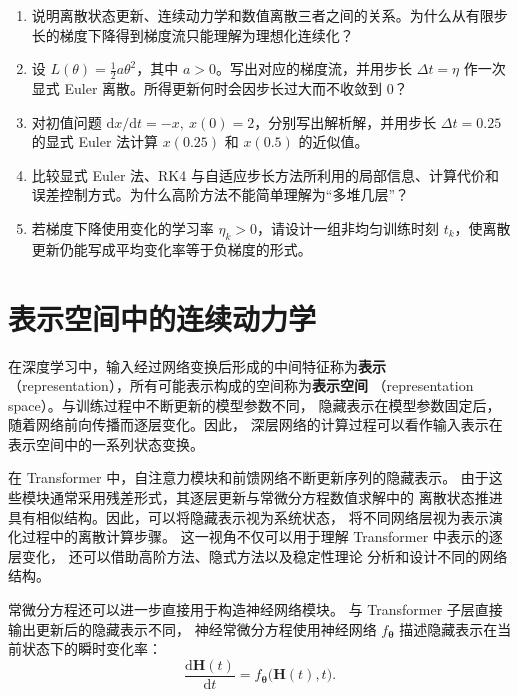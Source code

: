 \begin{exercisebox}
  \begin{enumerate}
    \item 说明离散状态更新、连续动力学和数值离散三者之间的关系。为什么从有限步长的梯度下降得到梯度流只能理解为理想化连续化？
    \item 设 \(L(\theta)=\tfrac12 a\theta^2\)，其中 \(a>0\)。写出对应的梯度流，并用步长 \(\Delta t=\eta\) 作一次显式 Euler 离散。所得更新何时会因步长过大而不收敛到 \(0\)？
    \item 对初值问题 \(\mathrm dx/\mathrm dt=-x,\ x(0)=2\)，分别写出解析解，并用步长 \(\Delta t=0.25\) 的显式 Euler 法计算 \(x(0.25)\) 和 \(x(0.5)\) 的近似值。
    \item 比较显式 Euler 法、RK4 与自适应步长方法所利用的局部信息、计算代价和误差控制方式。为什么高阶方法不能简单理解为“多堆几层”？
    \item 若梯度下降使用变化的学习率 \(\eta_k>0\)，请设计一组非均匀训练时刻 \(t_k\)，使离散更新仍能写成平均变化率等于负梯度的形式。
  \end{enumerate}
\end{exercisebox}



\section{表示空间中的连续动力学}
\label{sec:representation-dynamics}

在深度学习中，输入经过网络变换后形成的中间特征称为\textbf{表示}
（representation），所有可能表示构成的空间称为\textbf{表示空间}
（representation space）。与训练过程中不断更新的模型参数不同，
隐藏表示在模型参数固定后，随着网络前向传播而逐层变化。因此，
深层网络的计算过程可以看作输入表示在表示空间中的一系列状态变换。

在 Transformer 中，自注意力模块和前馈网络不断更新序列的隐藏表示。
由于这些模块通常采用残差形式，其逐层更新与常微分方程数值求解中的
离散状态推进具有相似结构。因此，可以将隐藏表示视为系统状态，
将不同网络层视为表示演化过程中的离散计算步骤。
这一视角不仅可以用于理解 Transformer 中表示的逐层变化，
还可以借助高阶方法、隐式方法以及稳定性理论
分析和设计不同的网络结构。

常微分方程还可以进一步直接用于构造神经网络模块。
与 Transformer 子层直接输出更新后的隐藏表示不同，
神经常微分方程使用神经网络
\(f_{\boldsymbol{\theta}}\)
描述隐藏表示在当前状态下的瞬时变化率：
\begin{equation}
    \frac{\mathrm{d}\boldsymbol{H}(t)}
    {\mathrm{d}t}
    =
    f_{\boldsymbol{\theta}}
    \bigl(
        \boldsymbol{H}(t),t
    \bigr).
    \label{eq:continuous-representation-dynamics}
\end{equation}

